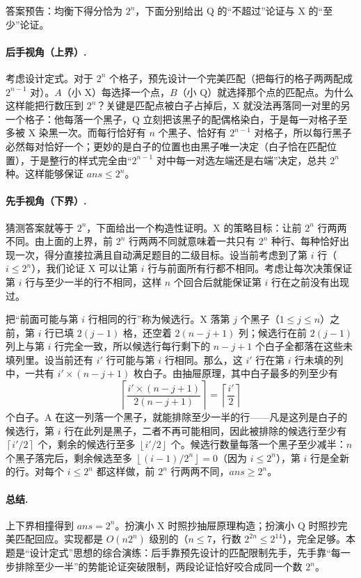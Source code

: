 \documentclass[UTF8,a4paper,11pt,oneside,openany,fontset=fandol]{ctexbook}
\theoremstyle{definition}
\newcommand{\floor}[1]{\left\lfloor #1\right\rfloor}
\newcommand{\ceil}[1]{\left\lceil #1\right\rceil}
\begin{document}
答案预告：均衡下得分恰为 $2^{n}$，下面分别给出 Q 的“不超过”论证与 X 的“至少”论证。

\paragraph{后手视角（上界）.} 考虑设计定式。对于 $2^{n}$ 个格子，预先设计一个完美匹配（把每行的格子两两配成 $2^{n-1}$ 对）。$A$（小 X）每选择一个点，$B$（小 Q）就选择那个点的匹配点。为什么这样能把行数压到 $2^{n}$？关键是匹配点被白子占掉后，X 就没法再落同一对里的另一个格子：他每落一个黑子，Q 立刻把该黑子的配偶格染白，于是每一对格子至多被 X 染黑一次。而每行恰好有 $n$ 个黑子、恰好有 $2^{n-1}$ 对格子，所以每行黑子必然每对恰好一个；更妙的是白子的位置也由黑子唯一决定（白子恰在匹配位置），于是整行的样式完全由“$2^{n-1}$ 对中每一对选左端还是右端”决定，总共 $2^{n}$ 种。这样能够保证 $ans\le2^{n}$。

\paragraph{先手视角（下界）.} 猜测答案就等于 $2^{n}$，下面给出一个构造性证明。X 的策略目标：让前 $2^{n}$ 行两两不同。由上面的上界，前 $2^{n}$ 行两两不同就意味着一共只有 $2^{n}$ 种行、每种恰好出现一次，得分直接拉满且自动满足题目的二级目标。设当前考虑到了第 $i$ 行（$i\le2^{n}$），我们论证 X 可以让第 $i$ 行与前面所有行都不相同。考虑让每次决策保证第 $i$ 行与至少一半的行不相同，这样 $n$ 个回合后就能保证第 $i$ 行在之前没有出现过。

把“前面可能与第 $i$ 行相同的行”称为候选行。X 落第 $j$ 个黑子（$1\le j\le n$）之前，第 $i$ 行已填 $2(j-1)$ 格，还空着 $2(n-j+1)$ 列；候选行在前 $2(j-1)$ 列上与第 $i$ 行完全一致，所以候选行每行剩下的 $n-j+1$ 个白子全都落在这些未填列里。设当前还有 $i'$ 行可能与第 $i$ 行相同。那么，这 $i'$ 行在第 $i$ 行未填的列中，一共有 $i'\times(n-j+1)$ 枚白子。由抽屉原理，其中白子最多的列至少有
\[
 \ceil{\frac{i'\times(n-j+1)}{2(n-j+1)}}=\ceil{\frac{i'}{2}}
\]
个白子。A 在这一列落一个黑子，就能排除至少一半的行——凡是这列是白子的候选行，第 $i$ 行在此列是黑子，二者不再可能相同，因此被排除的候选行至少有 $\ceil{i'/2}$ 个，剩余的候选行至多 $\floor{i'/2}$ 个。候选行数量每落一个黑子至少减半：$n$ 个黑子落完后，剩余候选至多 $\floor{(i-1)/2^{n}}=0$（因为 $i\le2^{n}$），第 $i$ 行是全新的行。对每个 $i\le2^{n}$ 都这样做，前 $2^{n}$ 行两两不同，$ans\ge2^{n}$。

\paragraph{总结.} 上下界相撞得到 $ans=2^{n}$。扮演小 X 时照抄抽屉原理构造；扮演小 Q 时照抄完美匹配回应。实现都是 $O(n2^{n})$ 级别的（$n\le7$，行数 $2^{2n}\le2^{14}$），完全足够。本题是“设计定式”思想的综合演练：后手靠预先设计的匹配限制先手，先手靠“每一步排除至少一半”的势能论证突破限制，两段论证恰好咬合成同一个数 $2^{n}$。
\end{document}
